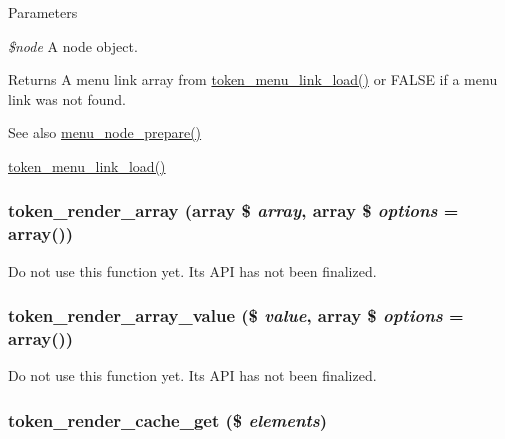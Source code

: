 \begin{DoxyParams}{Parameters}
\item[{\em \$node}]A node object.\end{DoxyParams}
\begin{DoxyReturn}{Returns}
A menu link array from \hyperlink{token_8module_aa10d2e27b2947c29152b40bc0bb3b495}{token\_\-menu\_\-link\_\-load()} or FALSE if a menu link was not found.
\end{DoxyReturn}
\begin{DoxySeeAlso}{See also}
\hyperlink{menu_8module_aa61d00657e2f5efac6e157ad14dff4bb}{menu\_\-node\_\-prepare()} 

\hyperlink{token_8module_aa10d2e27b2947c29152b40bc0bb3b495}{token\_\-menu\_\-link\_\-load()} 
\end{DoxySeeAlso}
\hypertarget{token_8module_a53f85bf43961f4d639af9cee78caee26}{
\subsubsection[{token\_\-render\_\-array}]{\setlength{\rightskip}{0pt plus 5cm}token\_\-render\_\-array (array \$ {\em array}, \/  array \$ {\em options} = {\ttfamily array()})}}
\label{token_8module_a53f85bf43961f4d639af9cee78caee26}
Do not use this function yet. Its API has not been finalized. \hypertarget{token_8module_aa5c8c0b76fdd4786224a066ce1387833}{
\subsubsection[{token\_\-render\_\-array\_\-value}]{\setlength{\rightskip}{0pt plus 5cm}token\_\-render\_\-array\_\-value (\$ {\em value}, \/  array \$ {\em options} = {\ttfamily array()})}}
\label{token_8module_aa5c8c0b76fdd4786224a066ce1387833}
Do not use this function yet. Its API has not been finalized. \hypertarget{token_8module_ade265e3948eec87805cabf40bf0c233d}{
\subsubsection[{token\_\-render\_\-cache\_\-get}]{\setlength{\rightskip}{0pt plus 5cm}token\_\-render\_\-cache\_\-get (\$ {\em elements})}}
